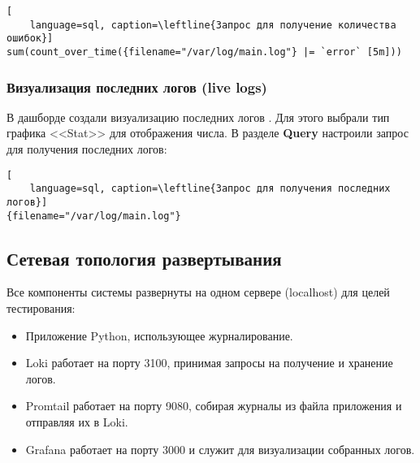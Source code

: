 \begin{lstlisting}[
	language=sql, caption=\leftline{Запрос для получение количества ошибок}]
sum(count_over_time({filename="/var/log/main.log"} |= `error` [5m]))
\end{lstlisting}

\begin{image}
    \caption{Создание визуализации количества ошибок}
    \label{fig:vis:errors}
\end{image}

\subsubsection{Визуализация последних логов (live logs)}

В дашборде создали визуализацию последних логов .
Для этого выбрали тип графика <<Stat>> для отображения числа.
В разделе \textbf{Query} настроили запрос для получения последних логов:

\begin{lstlisting}[
	language=sql, caption=\leftline{Запрос для получения последних логов}]
{filename="/var/log/main.log"}
\end{lstlisting}

\begin{image}
    \caption{Создание визуализации последних логов}
    \label{fig:vis:live}
\end{image}

\subsection{Сетевая топология развертывания}

Все компоненты системы развернуты на одном сервере (localhost)
для целей тестирования:

\begin{itemize}
    \item Приложение Python, использующее журналирование.
    \item Loki работает на порту 3100,
		принимая запросы на получение и хранение логов.
    \item Promtail работает на порту 9080,
		собирая журналы из файла приложения и отправляя их в Loki.
    \item Grafana работает на порту 3000
		и служит для визуализации собранных логов.
\end{itemize}

